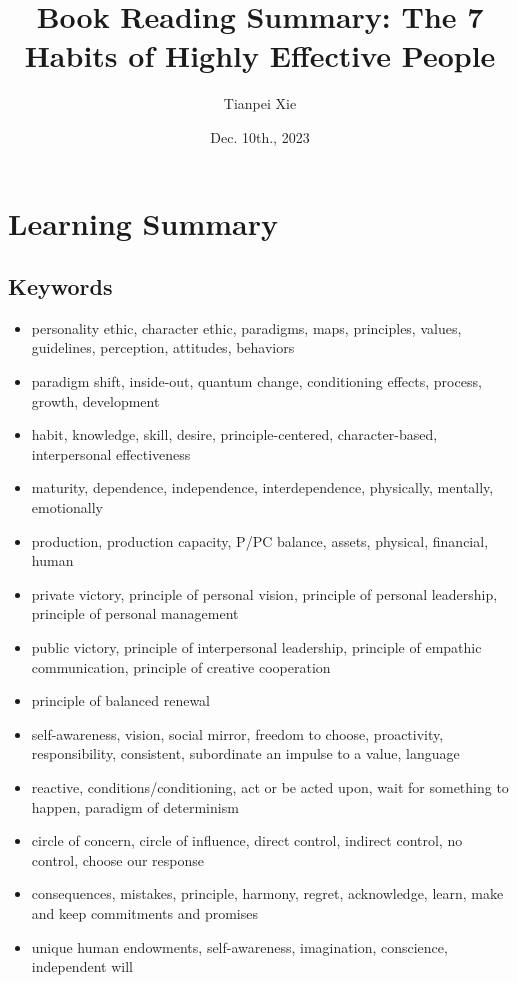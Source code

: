 \documentclass[11pt]{article}
\begin{document}
\title{Book Reading Summary: The 7 Habits of Highly Effective People}
\author{ Tianpei Xie}
\date{Dec. 10th., 2023}
\maketitle
\tableofcontents
\newpage
\section{Learning Summary}
\subsection{Keywords}
\begin{itemize}
\item personality ethic, character ethic, paradigms, maps, principles, values, guidelines,  perception, attitudes, behaviors
\item paradigm shift, inside-out, quantum change, conditioning effects, process,  growth, development
\item habit, knowledge, skill, desire,  principle-centered, character-based, interpersonal effectiveness
\item maturity, dependence, independence, interdependence, physically, mentally, emotionally
\item production, production capacity, P/PC balance, assets, physical, financial, human
\item private victory, principle of personal vision, principle of personal leadership, principle of personal management 
\item public victory, principle of interpersonal leadership, principle of empathic communication, principle of creative cooperation
\item principle of balanced renewal
\item self-awareness, vision, social mirror, freedom to choose, proactivity, responsibility, consistent, subordinate an impulse to a value, language
\item reactive, conditions/conditioning,  act or be acted upon, wait for something to happen, paradigm of determinism
\item circle of concern, circle of influence, direct control, indirect control, no control, choose our response
\item consequences, mistakes, principle, harmony, regret, acknowledge, learn, make and keep commitments and promises
\item unique human endowments, self-awareness, imagination, conscience, independent will

\end{itemize}
\end{document}
